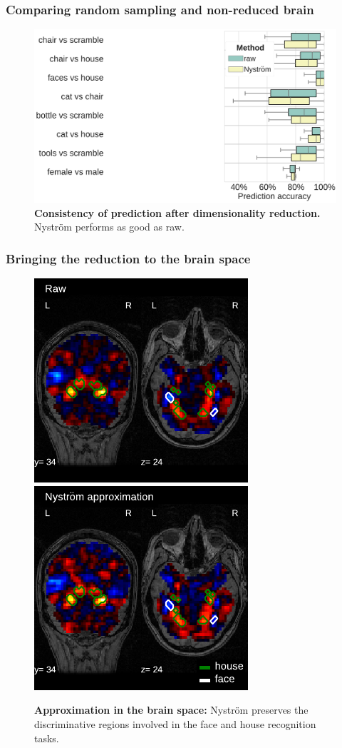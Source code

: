 \documentclass{beamer}
\begin{document}
\begin{frame}\frametitle{\textbf{Comparing} random sampling and non-reduced 
brain}
\begin{figure}
\centering
\includegraphics[width=1\linewidth]{figures/correlation_1.pdf}
\caption{\textbf{Consistency of prediction after dimensionality 
reduction.} Nystr\"om performs as good as raw.}
\end{figure}
\end{frame}


\begin{frame}\frametitle{\textbf{Bringing the reduction to the brain space}}
\begin{figure}
\centering
\includegraphics[width=0.43\linewidth]{figures/raw_faces_vs_house_1.pdf}\quad 
\includegraphics[width=0.43\linewidth]{figures/nystrom_faces_vs_house_1.pdf}
\caption{\textbf{Approximation in the brain space:} Nystr\"om preserves the 
discriminative regions involved in the face and house recognition tasks.}
\end{figure}
\end{frame}
\end{document}
